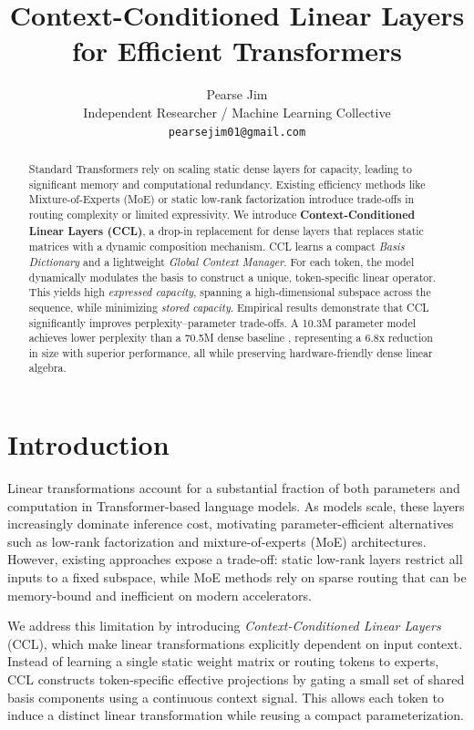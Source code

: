 \documentclass[11pt]{article}
\title{Context-Conditioned Linear Layers for Efficient Transformers}
\author{Pearse Jim \\
  Independent Researcher / Machine Learning Collective\\
  \texttt{pearsejim01@gmail.com} \\\And
  }
\begin{document}
\maketitle

\begin{abstract}
Standard Transformers rely on scaling static dense layers for capacity, leading to significant memory and computational redundancy. Existing efficiency methods like Mixture-of-Experts (MoE) or static low-rank factorization introduce trade-offs in routing complexity or limited expressivity. We introduce \textbf{Context-Conditioned Linear Layers (CCL)}, a drop-in replacement for dense layers that replaces static matrices with a dynamic composition mechanism. CCL learns a compact \textit{Basis Dictionary} and a lightweight \textit{Global Context Manager}. For each token, the model dynamically modulates the basis to construct a unique, token-specific linear operator. This yields high \textit{expressed capacity}, spanning a high-dimensional subspace across the sequence, while minimizing \textit{stored capacity}. Empirical results demonstrate that CCL significantly improves perplexity–parameter trade-offs. A 10.3M parameter model achieves lower perplexity than a 70.5M dense baseline , representing a 6.8x reduction in size with superior performance, all while preserving hardware-friendly dense linear algebra.
\end{abstract}
\section{Introduction}

Linear transformations account for a substantial fraction of both parameters and computation in Transformer-based language models. As models scale, these layers increasingly dominate inference cost, motivating parameter-efficient alternatives such as low-rank factorization and mixture-of-experts (MoE) architectures. However, existing approaches expose a trade-off: static low-rank layers restrict all inputs to a fixed subspace, while MoE methods rely on sparse routing that can be memory-bound and inefficient on modern accelerators.

We address this limitation by introducing \emph{Context-Conditioned Linear Layers} (CCL), which make linear transformations explicitly dependent on input context. Instead of learning a single static weight matrix or routing tokens to experts, CCL constructs token-specific effective projections by gating a small set of shared basis components using a continuous context signal. This allows each token to induce a distinct linear transformation while reusing a compact parameterization.
\end{document}
